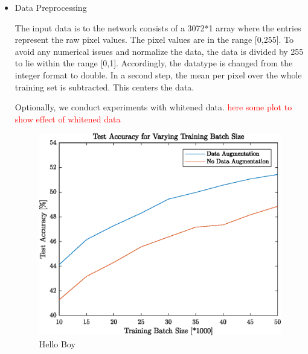 \begin{itemize}
   	\item Data Preprocessing
  	
  	The input data is to the network consists of a 3072*1 array where the entries represent the raw pixel values. The pixel values are in the range [0,255]. To avoid any numerical issues and normalize the data, the data is divided by 255 to lie within the range [0,1]. Accordingly, the datatype is changed from the integer format to double. In a second step, the mean per pixel over the whole training set is subtracted. This centers the data.
  	
  	Optionally, we conduct experiments with whitened data. \textcolor{red}{here some plot to show effect of whitened data}
  	
  	\begin{figure}[h!]
  		\centering
  		\includegraphics{images/dataAugmentation}
  		\caption{Hello Boy}
  		\label{fig:test1}
  	\end{figure}
  	

\end{itemize}
